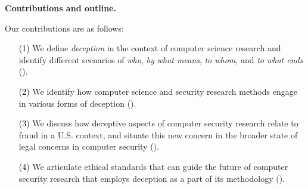 \textbf{Contributions and outline.}
\label{sec:contributions}

Our contributions are as follows:
\begin{enumerate}
\item[\textcolor{black}{(1)}] We define \emph{deception} in the context of computer science research and identify different scenarios of \emph{who}, \emph{by what means}, \emph{to whom}, and \emph{to what ends} ().
\item[\textcolor{black}{(2)}] We identify how %
computer science and security research methods engage in various forms of deception ().
\item[\textcolor{black}{(3)}] We discuss how deceptive aspects of computer security research relate to fraud in a U.S. context, and situate this new concern in the broader state of legal concerns in computer security
().
\item[\textcolor{black}{(4)}] We articulate ethical standards that can guide the future of computer security research that employs deception as a part of its methodology ().
\end{enumerate}